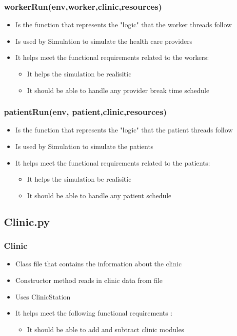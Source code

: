 \documentclass[12pt]{article}
\begin{document}
\subsubsection{workerRun(env,worker,clinic,resources)}
\begin{itemize}
	\item Is the function that represents the "logic" that the worker threads follow
	\item Is used by Simulation to simulate the health care providers
	\item It helps meet the functional requirements related to the workers:
	\begin{itemize}
		\item It helps the simulation be realisitic
		\item It should be able to handle any provider break time schedule
	\end{itemize}
\end{itemize}
\subsubsection{patientRun(env, patient,clinic,resources)}
\begin{itemize}
	\item Is the function that represents the "logic" that the patient threads follow
	\item Is used by Simulation to simulate the patients
	\item It helps meet the functional requirements related to the patients:
	\begin{itemize}
		\item It helps the simulation be realisitic
		\item It should be able to handle any patient schedule
	\end{itemize}
\end{itemize}

\subsection{Clinic.py}
\subsubsection{Clinic}
\begin{itemize}  
\item Class file that contains the information about the clinic
\item Constructor method reads in clinic data from file
\item Uses ClinicStation
\item It helps meet the following functional requirements :
\begin{itemize}
	\item It should be able to add and subtract clinic modules
\end{itemize}
\end{itemize}
\end{document}
